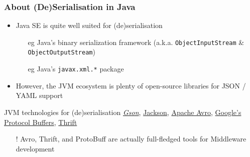 \documentclass[presentation]{beamer}\mode<presentation>{\usetheme{AMSCesenaPurpleAndGold}}
\begin{document}
\begin{frame}%
    \frametitle{About (De)Serialisation in Java}

    \begin{itemize}
        \item Java SE is quite well suited for (de)serialisation
        \begin{itemize}
            \item[eg] Java's binary serialization framework (a.k.a. \texttt{ObjectInputStream} \& \texttt{ObjectOutputStream})
            \item[eg] Java's \texttt{javax.xml.*} package
        \end{itemize}

        \vfill

        \item However, the JVM ecosystem is plenty of open-source libraries for JSON / YAML support

    \end{itemize}

    \vfill

    \begin{block}{JVM technologies for (de)serialisation}
        \href{https://github.com/google/gson}{\emph{Gson}},
        \href{https://github.com/FasterXML/jackson}{Jackson},
        \href{https://avro.apache.org/docs/1.10.0/}{Apache Avro},
        \href{https://developers.google.com/protocol-buffers}{Google's Protocol Buffers},
        \href{https://thrift.apache.org/}{Thrift}
    \end{block}
    \begin{itemize}\small
        \item[!] Avro, Thrift, and ProtoBuff are actually full-fledged tools for Middleware development
    \end{itemize}

\end{frame}
\end{document}

